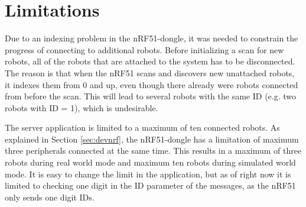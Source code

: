 \newpage
\section{Limitations}
\label{secr:limitations}
Due to an indexing problem in the nRF51-dongle, it was needed to constrain the progress of connecting to additional robots. Before initializing a scan for new robots, all of the robots that are attached to the system has to be disconnected. The reason is that when the nRF51 scans and discovers new unattached robots, it indexes them from 0 and up, even though there already were robots connected from before the scan. This will lead to several robots with the same ID (e.g. two robots with ID = 1), which is undesirable.

The server application is limited to a maximum of ten connected robots. As explained in Section \ref{sec:devnrf}, the nRF51-dongle has a limitation of maximum three peripherals connected at the same time. This results in a maximum of three robots during real world mode and maximum ten robots during simulated world mode. It is easy to change the limit in the application, but as of right now it is limited to checking one digit in the ID parameter of the messages, as the nRF51 only sends one digit IDs.